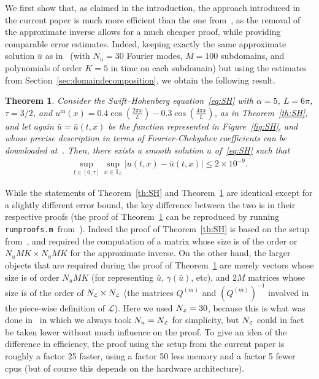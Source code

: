 \documentclass[10pt,a4paper]{article}
\theoremstyle{plain}
\newtheorem{theorem}{Theorem}[section]
\newcommand{\TT}{\mathbb T}
\renewcommand{\L}{\mathcal{L}}
\newcommand{\bu}{\bar{u}}
\newcommand{\1}{\mathbf{1}}
\newcommand{\tend}{\tau}
\newcommand{\runfile}{\texttt{runproofs.m}}
\newcommand{\uin}{{u^{\mathrm{in}}}}
\newcommand{\Nu}{N_{u}}
\newcommand{\NL}{N_{\text{\tiny{$\L$}}}}
\begin{document}
We first show that, as claimed in the introduction, the approach introduced in the current paper is much more efficient than the one from~\cite{BerBreShe24}, as the removal of the approximate inverse allows for a much cheaper proof, while providing comparable error estimates. Indeed, keeping exactly the same approximate solution $\bu$ as in~\cite{BerBreShe24} (with $\Nu=30$ Fourier modes, $M=100$ subdomains, and polynomials of order $K=5$ in time on each subdomain) but using the estimates from Section~\ref{sec:domaindecomposition}, we obtain the following result.
\begin{theorem}
\label{th:SH_new}
Consider the Swift--Hohenberg equation~\eqref{eq:SH} with $\alpha = 5$, $L=6\pi$, $\tend=3/2$, and $\uin(x) = 0.4\cos\left(\frac{2\pi x}{L}\right)-0.3\cos\left(\frac{4 \pi x}{L}\right)$, as in Theorem~\ref{th:SH}, and let again $\bu=\bu(t,x)$ be the function represented in Figure~\ref{fig:SH}, and whose precise description in terms of Fourier-Chebyshev coefficients can be downloaded at~\cite{integratorcode}. Then, there exists a smooth solution $u$ of~\eqref{eq:SH} such that
\begin{align*}
\sup_{t\in [0,\tend]} \sup_{x\in \TT_L} \vert u(t,x)-\bu(t,x) \vert \leq 
2\times 10^{-9}.
\end{align*}
\end{theorem}
While the statements of Theorem~\ref{th:SH} and Theorem~\ref{th:SH_new} are identical except for a slightly different error bound, the key difference between the two is in their respective proofs (the proof of Theorem~\ref{th:SH_new} can be reproduced by running \runfile ~from~\cite{integratorcode_new}). Indeed the proof of Theorem~\ref{th:SH} is based on the setup from~\cite{BerBreShe24}, and required the computation of a matrix whose size is of the order or $\Nu M K\times\Nu M K$ for the approximate inverse. On the other hand, the larger objects that are required during the proof of Theorem~\ref{th:SH_new} are merely vectors whose size is of order $\Nu M K$ (for representing $\bu$, $\gamma(\bu)$, etc), and $2M$ matrices whose size is of the order of $\NL\times\NL$ (the matrices $Q^{(m)}$ and $\left(Q^{(m)}\right)^{-1}$ involved in the piece-wise definition of $\L$). Here we used $\NL = 30$, because this is what was done in~\cite{BerBreShe24} in which we always took $\Nu=\NL$ for simplicity, but $\NL$ could in fact be taken lower without much influence on the proof. To give an idea of the difference in efficiency, the proof using the setup from the current paper is roughly a factor 25 faster, using a factor 50 less memory and a factor 5 fewer cpus (but of course this depends on the hardware architecture).
\end{document}
